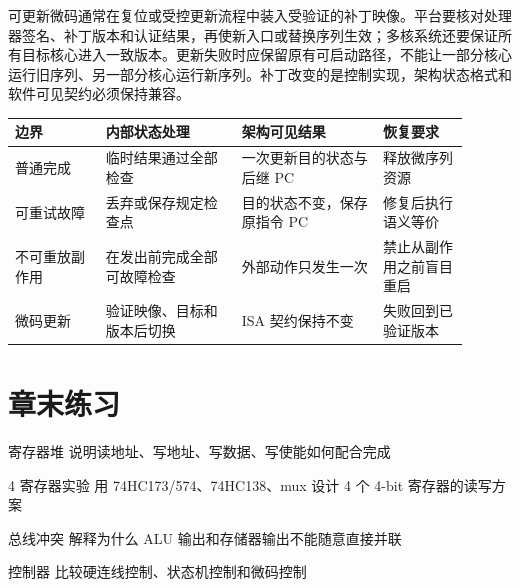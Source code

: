 可更新微码通常在复位或受控更新流程中装入受验证的补丁映像。平台要核对处理器签名、补丁版本和认证结果，再使新入口或替换序列生效；多核系统还要保证所有目标核心进入一致版本。更新失败时应保留原有可启动路径，不能让一部分核心运行旧序列、另一部分核心运行新序列。补丁改变的是控制实现，架构状态格式和软件可见契约必须保持兼容。

\begin{longtable}{L{0.18\linewidth}L{0.27\linewidth}L{0.28\linewidth}L{0.17\linewidth}}
\toprule
边界 & 内部状态处理 & 架构可见结果 & 恢复要求 \\
\midrule
普通完成 & 临时结果通过全部检查 & 一次更新目的状态与后继 PC & 释放微序列资源 \\\tablerowrule
可重试故障 & 丢弃或保存规定检查点 & 目的状态不变，保存原指令 PC & 修复后执行语义等价 \\\tablerowrule
不可重放副作用 & 在发出前完成全部可故障检查 & 外部动作只发生一次 & 禁止从副作用之前盲目重启 \\\tablerowrule
微码更新 & 验证映像、目标和版本后切换 & ISA 契约保持不变 & 失败回到已验证版本 \\
\bottomrule
\end{longtable}

\section*{章末练习}

\begin{chapterexercise}{寄存器堆}
说明读地址、写地址、写数据、写使能如何配合完成 
\end{chapterexercise}

\begin{chapterexercise}{4 寄存器实验}
用 74HC173/574、74HC138、mux 设计 4 个 4-bit 寄存器的读写方案
\end{chapterexercise}

\begin{chapterexercise}{总线冲突}
解释为什么 ALU 输出和存储器输出不能随意直接并联
\end{chapterexercise}

\begin{chapterexercise}{控制器}
比较硬连线控制、状态机控制和微码控制
\end{chapterexercise}


